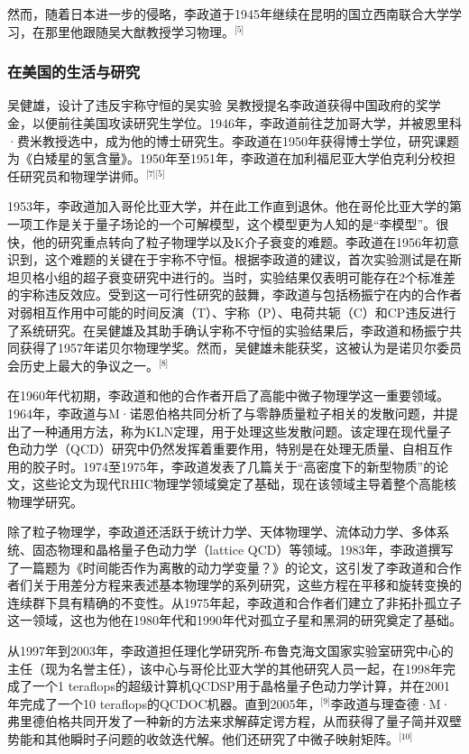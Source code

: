 然而，随着日本进一步的侵略，李政道于1945年继续在昆明的国立西南联合大学学习，在那里他跟随吴大猷教授学习物理。\(^\text{[5]}\)
\subsubsection{在美国的生活与研究}  
吴健雄，设计了违反宇称守恒的吴实验  
吴教授提名李政道获得中国政府的奖学金，以便前往美国攻读研究生学位。1946年，李政道前往芝加哥大学，并被恩里科·费米教授选中，成为他的博士研究生。李政道在1950年获得博士学位，研究课题为《白矮星的氢含量》。1950年至1951年，李政道在加利福尼亚大学伯克利分校担任研究员和物理学讲师。\(^\text{[7][5]}\)

1953年，李政道加入哥伦比亚大学，并在此工作直到退休。他在哥伦比亚大学的第一项工作是关于量子场论的一个可解模型，这个模型更为人知的是“李模型”。很快，他的研究重点转向了粒子物理学以及K介子衰变的难题。李政道在1956年初意识到，这个难题的关键在于宇称不守恒。根据李政道的建议，首次实验测试是在斯坦贝格小组的超子衰变研究中进行的。当时，实验结果仅表明可能存在2个标准差的宇称违反效应。受到这一可行性研究的鼓舞，李政道与包括杨振宁在内的合作者对弱相互作用中可能的时间反演（T）、宇称（P）、电荷共轭（C）和CP违反进行了系统研究。在吴健雄及其助手确认宇称不守恒的实验结果后，李政道和杨振宁共同获得了1957年诺贝尔物理学奖。然而，吴健雄未能获奖，这被认为是诺贝尔委员会历史上最大的争议之一。\(^\text{[8]}\)

在1960年代初期，李政道和他的合作者开启了高能中微子物理学这一重要领域。1964年，李政道与M·诺恩伯格共同分析了与零静质量粒子相关的发散问题，并提出了一种通用方法，称为KLN定理，用于处理这些发散问题。该定理在现代量子色动力学（QCD）研究中仍然发挥着重要作用，特别是在处理无质量、自相互作用的胶子时。1974至1975年，李政道发表了几篇关于“高密度下的新型物质”的论文，这些论文为现代RHIC物理学领域奠定了基础，现在该领域主导着整个高能核物理学研究。

除了粒子物理学，李政道还活跃于统计力学、天体物理学、流体动力学、多体系统、固态物理和晶格量子色动力学（lattice QCD）等领域。1983年，李政道撰写了一篇题为《时间能否作为离散的动力学变量？》的论文，这引发了李政道和合作者们关于用差分方程来表述基本物理学的系列研究，这些方程在平移和旋转变换的连续群下具有精确的不变性。从1975年起，李政道和合作者们建立了非拓扑孤立子这一领域，这也为他在1980年代和1990年代对孤立子星和黑洞的研究奠定了基础。

从1997年到2003年，李政道担任理化学研究所-布鲁克海文国家实验室研究中心的主任（现为名誉主任），该中心与哥伦比亚大学的其他研究人员一起，在1998年完成了一个1 teraflops的超级计算机QCDSP用于晶格量子色动力学计算，并在2001年完成了一个10 teraflops的QCDOC机器。直到2005年，\(^\text{[9]}\)李政道与理查德·M·弗里德伯格共同开发了一种新的方法来求解薛定谔方程，从而获得了量子简并双壁势能和其他瞬时子问题的收敛迭代解。他们还研究了中微子映射矩阵。\(^\text{[10]}\)

